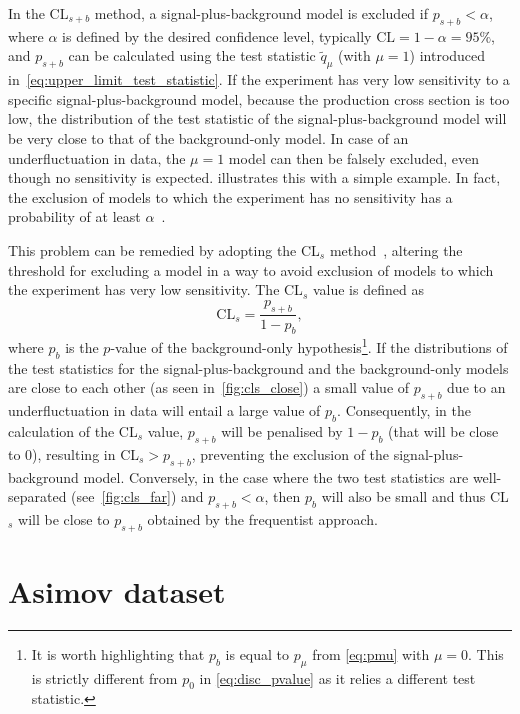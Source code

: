 In the CL$_{s+b}$ method, a signal-plus-background model is excluded if $p_{s+b} < \alpha$, where $\alpha$ is defined by the desired confidence level, typically $\mathrm{CL} = 1 - \alpha = 95\%$, and $p_{s+b}$ can be calculated using the test statistic $\tilde{q}_\mu$ (with $\mu = 1$) introduced in~\cref{eq:upper_limit_test_statistic}. If the experiment has very low sensitivity to a specific signal-plus-background model, \eg because the production cross section is too low, the distribution of the test statistic of the signal-plus-background model will be very close to that of the background-only model. In case of an underfluctuation in data, the $\mu = 1$ model can then be falsely excluded, even though no sensitivity is expected.  illustrates this with a simple example. In fact, the exclusion of models to which the experiment has no sensitivity has a probability of at least $\alpha$~\cite{Cowan:2013pha}.

This problem can be remedied by adopting the CL$_s$ method~\cite{Read:2002hq}, altering the threshold for excluding a model in a way to avoid exclusion of models to which the experiment has very low sensitivity. The CL$_s$ value is defined as
\begin{equation}
	\mathrm{CL}_s = \frac{p_{s+b}}{1-p_b},
\end{equation}
where $p_b$ is the $p$-value of the background-only hypothesis\footnote{It is worth highlighting that $p_b$ is equal to $p_\mu$ from \cref{eq:pmu} with $\mu=0$. This is strictly different from $p_0$ in \cref{eq:disc_pvalue} as it relies a different test statistic.}. If the distributions of the test statistics for the signal-plus-background and the background-only models are close to each other (as seen in~\cref{fig:cls_close}) a small value of $p_{s+b}$ due to an underfluctuation in data will entail a large value of $p_b$. Consequently, in the calculation of the CL$_s$ value, $p_{s+b}$ will be penalised by $1-p_b$ (that will be close to 0), resulting in CL$_s > p_{s+b}$, preventing the exclusion of the signal-plus-background model. Conversely, in the case where the two test statistics are well-separated (see~\cref{fig:cls_far}) and $p_{s+b} < \alpha$, then $p_b$ will also be small and thus CL$_s$ will be close to $p_{s+b}$ obtained by the frequentist approach. 

\section{Asimov dataset}

